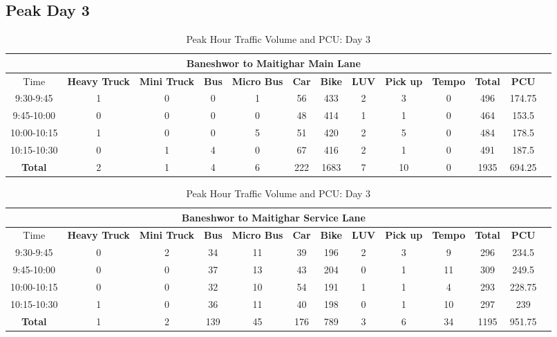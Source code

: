 \begin{landscape}
\centering
\section{Peak Day 3}
\begin{table}[h!]
\centering
\caption{Peak Hour Traffic Volume and PCU: Day 3}
\begin{tabular}{|c|c|c|c|c|c|c|c|c|c|c|c|c|}
    \hline
    \multicolumn{12}{|c|}{\textbf{Baneshwor to Maitighar Main Lane}} \\
    \hline
        Time & \textbf{Heavy Truck} & \textbf{Mini Truck} & \textbf{Bus} & \textbf{Micro Bus} & \textbf{Car} & \textbf{Bike} & \textbf{LUV} & \textbf{Pick up} & \textbf{Tempo} & \textbf{\textbf{Total}} & \textbf{PCU} \\
    \hline
   9:30-9:45	&1	&0	&0	&1	&56	&433	&2	&3	&0	&496	&174.75 \\ \hline
    9:45-10:00	&0	&0	&0	&0	&48	&414	&1	&1	&0	&464	&153.5 \\ \hline
    10:00-10:15	&1	&0	&0	&5	&51	&420	&2	&5	&0	&484	&178.5 \\ \hline
    10:15-10:30	&0	&1	&4	&0	&67	&416	&2	&1	&0	&491	&187.5 \\   \hline
    \textbf{Total}	&2	&1	&4	&6	&222	&1683	&7	&10	&0	&1935	&694.25 \\ \hline

\end{tabular}

\vspace{0.5cm}
\begin{tabular}{|c|c|c|c|c|c|c|c|c|c|c|c|c|}
    \hline
    \multicolumn{12}{|c|}{\textbf{Baneshwor to Maitighar Service Lane}} \\
    \hline
        Time & \textbf{Heavy Truck} & \textbf{Mini Truck} & \textbf{Bus} & \textbf{Micro Bus} & \textbf{Car} & \textbf{Bike} & \textbf{LUV} & \textbf{Pick up} & \textbf{Tempo} & \textbf{\textbf{Total}} & \textbf{PCU} \\
    \hline
   9:30-9:45	&0	&2	&34	&11	&39	&196	&2	&3	&9	&296	&234.5 \\ \hline
9:45-10:00	&0	&0	&37	&13	&43	&204	&0	&1	&11	&309	&249.5 \\ \hline
10:00-10:15	&0	&0	&32	&10	&54	&191	&1	&1	&4	&293	&228.75 \\ \hline
10:15-10:30	&1	&0	&36	&11	&40	&198	&0	&1	&10	&297	&239 \\ \hline
\textbf{Total}	&1	&2	&139	&45	&176	&789	&3	&6	&34	&1195	&951.75 \\ \hline

    \hline
\end{tabular}

\end{table}
\end{landscape}

